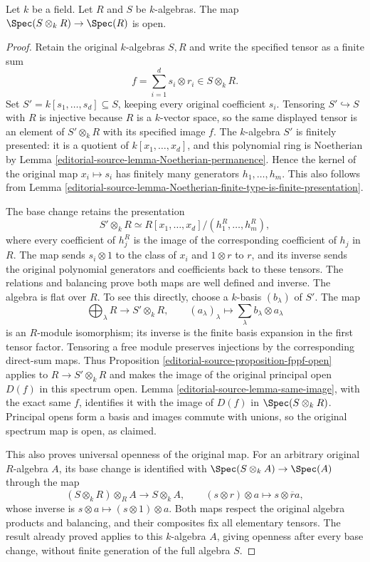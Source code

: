 \begin{lemma}
\label{editorial-source-lemma-map-into-tensor-algebra-open}
Let $k$ be a field.
Let $R$ and $S$ be $k$-algebras.
The map $\Spec(S \otimes_k R) \to \Spec(R)$
is open.
\end{lemma}

\begin{proof}
Retain the original $k$-algebras $S,R$ and write the
specified tensor as a finite sum
$$
f=\sum_{i=1}^d s_i\otimes r_i\in S\otimes_kR.
$$
Set $S'=k[s_1,\ldots,s_d]\subseteq S$, keeping every
original coefficient $s_i$. Tensoring $S'\hookrightarrow S$
with $R$ is injective because $R$ is a $k$-vector space,
so the same displayed tensor is an element of
$S'\otimes_kR$ with its specified image $f$.
The $k$-algebra $S'$ is finitely presented: it is
a quotient of $k[x_1,\ldots,x_d]$, and this polynomial
ring is Noetherian by Lemma \ref{editorial-source-lemma-Noetherian-permanence}.
Hence the kernel of the original map $x_i\mapsto s_i$
has finitely many generators $h_1,\ldots,h_m$.
This also follows from
Lemma \ref{editorial-source-lemma-Noetherian-finite-type-is-finite-presentation}.

The base change retains the presentation
$$
S'\otimes_kR\simeq R[x_1,\ldots,x_d]/(h_1^R,\ldots,h_m^R),
$$
where every coefficient of $h_j^R$ is the image of
the corresponding coefficient of $h_j$ in $R$.
The map sends $s_i\otimes1$ to the class of $x_i$
and $1\otimes r$ to $r$, and its inverse sends the
original polynomial generators and coefficients back
to these tensors. The relations and balancing prove
both maps are well defined and inverse.
The algebra is flat over $R$. To see this directly,
choose a $k$-basis $(b_\lambda)$ of $S'$.
The map
$$
\bigoplus_\lambda R\longrightarrow S'\otimes_kR,
\qquad (a_\lambda)_\lambda\longmapsto
\sum_\lambda b_\lambda\otimes a_\lambda
$$
is an $R$-module isomorphism; its inverse is the
finite basis expansion in the first tensor factor.
Tensoring a free module preserves injections by
the corresponding direct-sum maps. Thus
Proposition \ref{editorial-source-proposition-fppf-open} applies to
$R\to S'\otimes_kR$ and makes the image of the
original principal open $D(f)$ in this spectrum
open. Lemma \ref{editorial-source-lemma-same-image}, with the exact
same $f$, identifies it with the image of $D(f)$
in $\Spec(S\otimes_kR)$. Principal opens form a
basis and images commute with unions, so the
original spectrum map is open, as claimed.

This also proves universal openness of the
original map. For an arbitrary original $R$-algebra
$A$, its base change is identified with
$\Spec(S\otimes_kA)\to\Spec(A)$ through the map
$$
(S\otimes_kR)\otimes_RA\longrightarrow S\otimes_kA,
\qquad (s\otimes r)\otimes a\longmapsto s\otimes\overline r a,
$$
whose inverse is $s\otimes a\mapsto(s\otimes1)\otimes a$.
Both maps respect the original algebra products
and balancing, and their composites fix all
elementary tensors. The result already proved
applies to this $k$-algebra $A$, giving openness
after every base change, without finite generation
of the full algebra $S$.


\end{proof}
